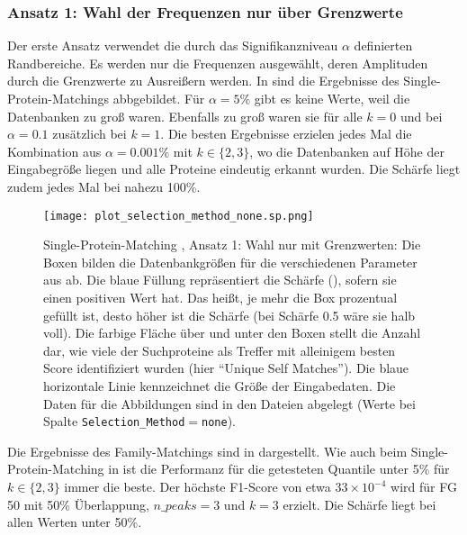         \subsubsection{Ansatz 1: Wahl der Frequenzen nur über Grenzwerte} %
            \label{ssub:ansatz_1_results}
            Der erste Ansatz verwendet die durch das Signifikanzniveau $\alpha$ definierten Randbereiche. Es werden nur die Frequenzen ausgewählt, deren Amplituden durch die Grenzwerte zu Ausreißern werden. In  sind die Ergebnisse des Single-Protein-Matchings abbgebildet. Für $\alpha=5\%$ gibt es keine Werte, weil die Datenbanken zu groß waren. Ebenfalls zu groß waren sie für alle $k=0$ und bei $\alpha=0.1$ zusätzlich bei $k=1$. Die besten Ergebnisse erzielen jedes Mal die Kombination aus $\alpha=0.001\%$ mit $k \in \{2, 3\}$, wo die Datenbanken auf Höhe der Eingabegröße liegen und alle Proteine eindeutig erkannt wurden. Die Schärfe liegt zudem jedes Mal bei nahezu 100\%.

            \begin{figure}[H]
                \texttt{[image: plot\_selection\_method\_none.sp.png]}
                \caption[Single-Protein-Matching , Ansatz 1: Wahl nur mit Grenzwerten]{Single-Protein-Matching , Ansatz 1: Wahl nur mit Grenzwerten: Die Boxen bilden die Datenbankgrößen für die verschiedenen Parameter aus  ab. Die blaue Füllung repräsentiert die Schärfe (), sofern sie einen positiven Wert hat. Das heißt, je mehr die Box prozentual gefüllt ist, desto höher ist die Schärfe (bei Schärfe 0.5 wäre sie halb voll). Die farbige Fläche über und unter den Boxen stellt die Anzahl dar, wie viele der Suchproteine als Treffer mit alleinigem besten Score identifiziert wurden (hier ``Unique Self Matches''). Die blaue horizontale Linie kennzeichnet die Größe der Eingabedaten. Die Daten für die Abbildungen sind in den Dateien  abgelegt (Werte bei Spalte \texttt{Selection\_Method}$=$\texttt{none}).}
                \label{fig:selection_method.none.sp}
            \end{figure}

            Die Ergebnisse des Family-Matchings sind in  dargestellt. Wie auch beim Single-Protein-Matching in  ist die Performanz für die getesteten Quantile unter 5\% für $k \in \{2, 3\}$ immer die beste. Der höchste F1-Score von etwa $33\times 10^{-4}$ wird für \ac{FG} 50 mit 50\% Überlappung, $n\_peaks=3$ und $k=3$ erzielt. Die Schärfe liegt bei allen Werten unter 50\%.

